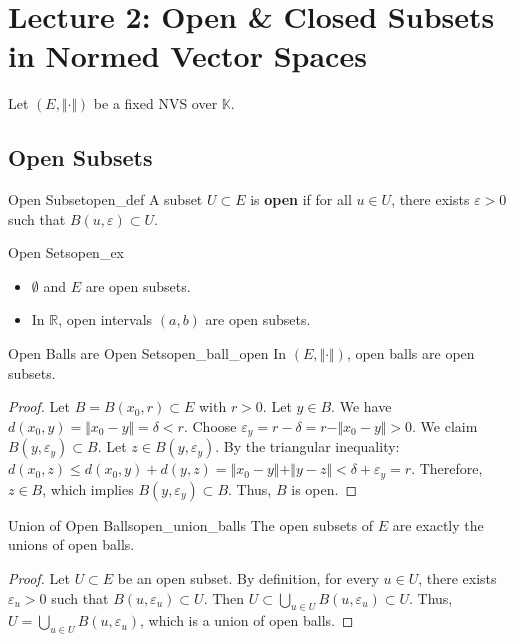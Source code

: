 \documentclass[11pt, a4paper]{article}
\newcommand{\R}{\mathbb{R}}
\newcommand{\eps}{\varepsilon}
\begin{document}
\section{Lecture 2: Open \& Closed Subsets in Normed Vector Spaces}
Let $(E, \Vert \cdot \Vert)$ be a fixed NVS over $\mathbb{K}$.

\subsection{Open Subsets}
\begin{definition}{Open Subset}{open_def}
A subset $U \subset E$ is \textbf{open} if for all $u \in U$, there exists $\eps > 0$ such that $B(u, \eps) \subset U$.
\end{definition}

\begin{example}{Open Sets}{open_ex}
\begin{itemize}
    \item $\emptyset$ and $E$ are open subsets.
    \item In $\R$, open intervals $(a, b)$ are open subsets.
\end{itemize}
\end{example}

\begin{proposition}{Open Balls are Open Sets}{open_ball_open}
In $(E, \Vert \cdot \Vert)$, open balls are open subsets.
\end{proposition}
\begin{proof}
Let $B = B(x_0, r) \subset E$ with $r > 0$. Let $y \in B$.
We have $d(x_0, y) = \Vert x_0 - y \Vert = \delta < r$.
Choose $\eps_y = r - \delta = r - \Vert x_0 - y \Vert > 0$. We claim $B(y, \eps_y) \subset B$.
Let $z \in B(y, \eps_y)$. By the triangular inequality:
$d(x_0, z) \le d(x_0, y) + d(y, z) = \Vert x_0 - y \Vert + \Vert y - z \Vert < \delta + \eps_y = r$.
Therefore, $z \in B$, which implies $B(y, \eps_y) \subset B$. Thus, $B$ is open.
\end{proof}

\begin{proposition}{Union of Open Balls}{open_union_balls}
The open subsets of $E$ are exactly the unions of open balls.
\end{proposition}
\begin{proof}
Let $U \subset E$ be an open subset.
By definition, for every $u \in U$, there exists $\eps_u > 0$ such that $B(u, \eps_u) \subset U$.
Then $U \subset \bigcup_{u \in U} B(u, \eps_u) \subset U$.
Thus, $U = \bigcup_{u \in U} B(u, \eps_u)$, which is a union of open balls.
\end{proof}
\end{document}
